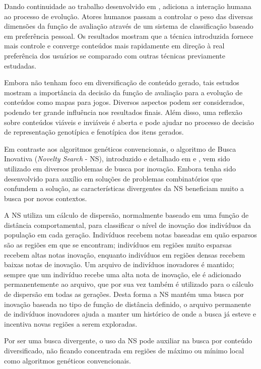 Dando continuidade ao trabalho desenvolvido em \cite{liapis2013generating}, \cite{liapis2013adaptive} adiciona a interação humana ao processo de evolução. Atores humanos passam a controlar o peso das diversas dimensões da função de avaliação através de um sistema de classificação baseado em preferência pessoal. Os resultados mostram que a técnica introduzida fornece mais controle e converge conteúdos mais rapidamente em direção à real preferência dos usuários se comparado com outras técnicas previamente estudadas.

Embora não tenham foco em diversificação de conteúdo gerado, tais estudos mostram a importância da decisão da função de avaliação para a evolução de conteúdos como mapas para jogos. Diversos aspectos podem ser considerados, podendo ter grande influência nos resultados finais. Além disso, uma reflexão sobre conteúdos viáveis e inviáveis é aberta e pode ajudar no processo de decisão de representação genotípica e fenotípica dos itens gerados.

Em contraste aos algoritmos genéticos convencionais, o algoritmo de Busca Inovativa (\emph{Novelty Search} - NS), introduzido e detalhado em \cite{lehman2008exploiting} e \cite{lehman2011abandoning}, vem sido utilizado em diversos problemas de busca por inovação. Embora tenha sido desenvolvido para auxílio em soluções de problemas combinatórios que confundem a solução, as características divergentes da NS beneficiam muito a busca por novos contextos.

A NS utiliza um cálculo de dispersão, normalmente baseado em uma função de distância comportamental, para classificar o nível de inovação dos indivíduos da população em cada geração. Indivíduos recebem notas baseadas em quão esparsos são as regiões em que se encontram; indivíduos em regiões muito esparsas recebem altas notas inovação, enquanto indivíduos em regiões densas recebem baixas notas de inovação. Um arquivo de indivíduos inovadores é mantido; sempre que um indivíduo recebe uma alta nota de inovação, ele é adicionado permanentemente ao arquivo, que por sua vez também é utilizado para o cálculo de dispersão em todas as gerações. Desta forma a NS mantém uma busca por inovação baseada no tipo de função de distância definido, o arquivo permanente de indivíduos inovadores ajuda a manter um histórico de onde a busca já esteve e incentiva novas regiões a serem exploradas.

Por ser uma busca divergente, o uso da NS pode auxiliar na busca por conteúdo diversificado, não ficando concentrada em regiões de máximo ou mínimo local como algoritmos genéticos convencionais.


